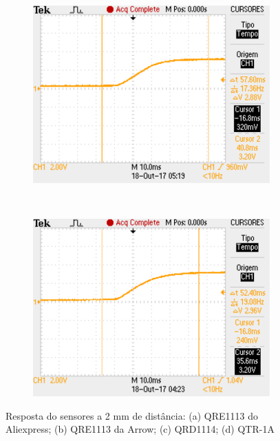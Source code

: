 \begin{frame}
\begin{figure}[h]
     \captionsetup{width=\textwidth,font=footnotesize,textfont=bf}
     \begin{subfigure}[b]{0.3\textwidth}
 	\centering
         \includegraphics[width=\textwidth,height=\textheight,keepaspectratio]{figuras/TestePaulo2mm.pdf}
         \caption{\centering \label{fig:TestePaulo2mm}}
     \end{subfigure}
     ~ 
     \begin{subfigure}[b]{0.3\textwidth}
 	\centering
         \includegraphics[width=\textwidth,height=\textheight,keepaspectratio]{figuras/TestePololu2mm.pdf}
         \caption{\centering \label{fig:TestePololu2mm}}
     \end{subfigure}

     \caption{Resposta do sensores a 2 mm de distância: (a) QRE1113 do Aliexpress; (b) QRE1113 da Arrow; (c) QRD1114; (d) QTR-1A}

 \end{figure}
\end{frame}


